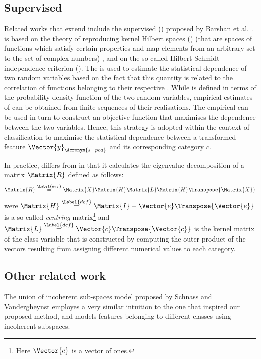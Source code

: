 \documentclass{article}
\def \newFea{\Vector{y}} 	%
\def \cat{c} 			%
\def \definition{\overset{\Label{def}}{=}}	%
\begin{document}
\subsection{Supervised }
Related works that extend  include the supervised  () proposed by Barshan et al. \cite{Barshan2011Su}.  is based on the theory of reproducing kernel Hilbert spaces () (that are spaces of functions which satisfy certain properties and map elements from an arbitrary set to the set of complex numbers) \cite{Aronszajn:1950}, and on the so-called Hilbert-Schmidt independence criterion ()\cite{gretton2005measuring}. The  is used to estimate the statistical dependence of two random variables based on the fact that this quantity is related to the correlation of functions belonging to their respective . While  is defined in terms of the probability density function of the two random variables,  empirical estimates of  can be obtained from finite sequences of their realisations. The empirical  can be used in turn to construct an objective function that maximises the dependence between the two variables. Hence, this strategy is adopted within the context of classification to maximise the statistical dependence between a transformed feature $\newFea_{\Acronym{s-pca}}$ and its corresponding category $\cat$.

In practice,  differs from  in that it calculates the eigenvalue decomposition of a matrix $\Matrix{R}$ defined as follows:
\begin{equation}
\Matrix{R} \definition \Matrix{X}\Matrix{H}\Matrix{L}\Matrix{H}\Transpose{\Matrix{X}}
\end{equation}
were $\Matrix{H} \definition \Matrix{I} - \Vector{e}\Transpose{\Vector{e}}$ is a so-called \emph{centring} matrix\footnote{Here $\Vector{e}$ is a vector of ones.} and $\Matrix{L} \definition \Vector{\cat}\Transpose{\Vector{\cat}}$ is the kernel matrix of the class variable that is constructed by computing the outer product of the vectors resulting from assigning different numerical values to each category. 

\subsection{Other related work}
The union of incoherent sub-spaces model proposed by Schnass and Vandergheynst \cite{Schnass2010A-} employes a very similar intuition to the one that inspired our proposed method, and models features belonging to different classes using incoherent subspaces. 
\end{document}
